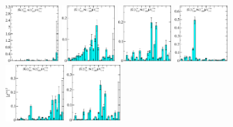 \begin{figure}[H]
    \includegraphics[width=0.18\textwidth]{figures/sigmas/g2u/zfactors/zfactor_isotriplet_kbar_delta-G2u_1-P011-A2-SS_1-P0-1-1-G-SS_0.pdf}
    \includegraphics[width=0.18\textwidth]{figures/sigmas/g2u/zfactors/zfactor_isotriplet_kbar_nucleon-G2u_1-P001-E-SS_2-P00-1-G1-SS_0.pdf}
    \includegraphics[width=0.18\textwidth]{figures/sigmas/g2u/zfactors/zfactor_isotriplet_kbar_nucleon-G2u_1-P011-A1-SS_3-P0-1-1-G-SS_0.pdf}
    \includegraphics[width=0.18\textwidth]{figures/sigmas/g2u/zfactors/zfactor_isotriplet_kbar_nucleon-G2u_1-P011-A2-SS_0-P0-1-1-G-SS_0.pdf}\\
    \includegraphics[width=0.1975\textwidth]{figures/sigmas/g2u/zfactors/zfactor_isotriplet_kbar_nucleon-G2u_1-P011-A2-SS_1-P0-1-1-G-SS_0.pdf}
    \includegraphics[width=0.18\textwidth]{figures/sigmas/g2u/zfactors/zfactor_isotriplet_kbar_nucleon-G2u_1-P011-B1-SS_1-P0-1-1-G-SS_0.pdf}

\end{figure}
